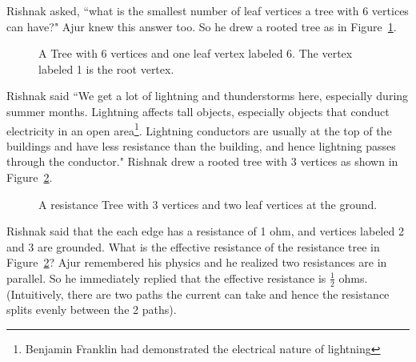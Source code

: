 Rishnak asked, ``what is the smallest number of leaf vertices a tree with 6 vertices can have?" Ajur knew this answer too. So he drew a rooted tree as in Figure~\ref{t2}.

\begin{figure}
\begin{center}

\caption{A Tree with 6 vertices and one leaf vertex labeled 6. The vertex labeled 1 is the root vertex.}\label{t2}
\end{center}
\end{figure}

Rishnak said ``We get a lot of lightning and thunderstorms here, especially during summer months. Lightning affects tall objects, especially objects that conduct electricity in an open area\footnote{Benjamin Franklin had demonstrated the electrical nature of lightning}. Lightning conductors are usually at the top of the buildings and have less resistance than the building, and hence lightning passes through the conductor." Rishnak drew a rooted tree with 3 vertices as shown in Figure~\ref{t3}.

\begin{figure}
\begin{center}


\caption{A resistance  Tree with 3 vertices and two leaf vertices at the ground. }\label{t3}
\end{center}
\end{figure}


Rishnak said that the each edge has a resistance of 1 ohm, and vertices labeled 2 and 3 are grounded. What is the effective resistance of the resistance tree in Figure~\ref{t3}? Ajur remembered his physics and he realized two resistances are in parallel. So he immediately replied that the effective resistance is $\frac{1}{2}$ ohms. (Intuitively, there are two paths the current can take and hence the resistance splits evenly between the 2 paths).


